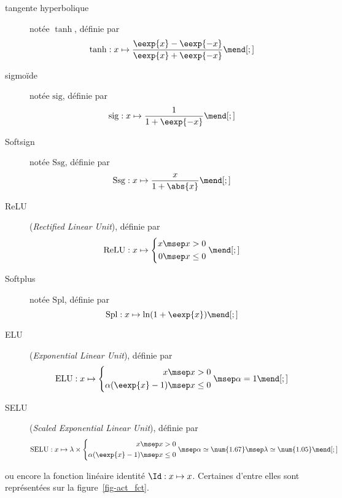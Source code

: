 \begin{description}
\item[tangente hyperbolique] notée $\tanh$, définie par
\begin{equation}
\tanh
:x\mapsto
\frac{\eexp{x}-\eexp{-x}}{\eexp{x}+\eexp{-x}}
\label{eq-act_fct-tanh}
\mend[;]
\end{equation}
\item[sigmoïde] notée $\mathrm{sig}$, définie par
\begin{equation}
\mathrm{sig}
:x\mapsto
\frac{1}{1+\eexp{-x}}
\label{eq-act_fct-sig}
\mend[;]
\end{equation}
\item[Softsign] notée $\mathrm{Ssg}$, définie par
\begin{equation}
\mathrm{Ssg}
:x\mapsto
\frac{x}{1+\abs{x}}
\label{eq-act_fct-ssg}
\mend[;]
\end{equation}
\item[ReLU] (\emph{Rectified Linear Unit}), définie par
\begin{equation}
\mathrm{ReLU}
:x\mapsto
\left\lbrace \begin{aligned}
x\msep & x > 0\\
0\msep & x \leq 0
\end{aligned} \right.
\label{eq-act_fct-relu}
\mend[;]
\end{equation}
\item[Softplus] notée $\mathrm{Spl}$, définie par
\begin{equation}
\mathrm{Spl}
:x\mapsto
\ln(1+\eexp{x})
\label{eq-act_fct-spl}
\mend[;]
\end{equation}
\item[ELU] (\emph{Exponential Linear Unit}), définie par
\begin{equation}
\mathrm{ELU}
:x\mapsto
\left\lbrace \begin{aligned}
x\msep & x > 0\\
\alpha(\eexp{x}-1)\msep & x \leq 0
\end{aligned} \right.
\msep
\alpha=1
\label{eq-act_fct-elu}
\mend[;]
\end{equation}
\item[SELU] (\emph{Scaled Exponential Linear Unit}), définie par
\begin{equation}
\mathrm{SELU}
:x\mapsto
\lambda\times\left\lbrace \begin{aligned}
x\msep & x > 0\\
\alpha(\eexp{x}-1)\msep & x \leq 0
\end{aligned} \right.
\msep
\alpha \simeq \num{1.67}
\msep
\lambda \simeq \num{1.05}
\label{eq-act_fct-selu}
\mend[;]
\end{equation}
\end{description}
ou encore la fonction linéaire identité $\Id:x\mapsto x$.
Certaines d'entre elles sont représentées sur la figure~\ref{fig-act_fct}.